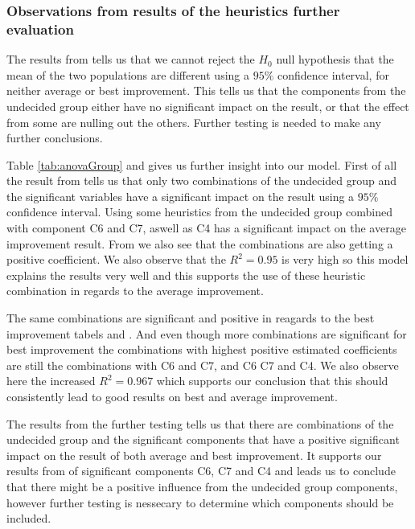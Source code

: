 \documentclass[../main.tex]{subfiles}
\begin{document}
\subsubsection{Observations from results of the heuristics further evaluation}
The results from  tells us that we cannot reject the $H_0$ null hypothesis  that the mean of the two populations are different using a $95\%$ confidence interval, for neither average or best improvement.
This tells us that the components from the undecided group either have no significant impact on the result, or that the effect from some are nulling out the others. Further testing is needed to make any further conclusions. \par
Table \ref{tab:anovaGroup} and  gives us further insight into our model.
First of all the result from  tells us that only two combinations of the undecided group and the significant variables have a significant impact on the result using a $95\%$ confidence interval.
Using some heuristics from the undecided group combined with component C6 and C7, aswell as C4 has a significant impact on the average improvement result.
From  we also see that the combinations are also getting a positive coefficient.
We also observe that the $R^2 = 0.95$ is very high so this model explains the results very well and this supports the use of these heuristic combination in regards to the average improvement.
\par
The same combinations are significant and positive in reagards to the best improvement tabels  and .
And even though more combinations are significant for best improvement the combinations with highest positive estimated coefficients are still the combinations with C6 and C7, and C6 C7 and C4.
We also observe here the increased $R^2 = 0.967$ which supports our conclusion that this should consistently lead to good results on best and average improvement.
\par
The results from the further testing tells us that there are combinations of the undecided group and the significant components that have a positive significant impact on the result of both average and best improvement. 
It supports our results from  of significant components C6, C7 and C4 and leads us to conclude that there might be a positive influence from the undecided group components, however further testing is nessecary to determine which components should be included. 
\end{document}
